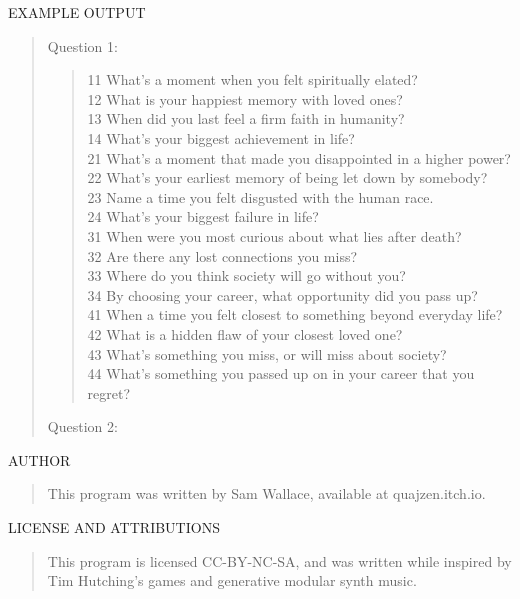 \documentclass{article}
\begin{document}
EXAMPLE OUTPUT
\begin{quote}
  Question 1:
  \begin{quote}
    11 \qquad What's a moment when you felt spiritually elated? \\
    12 \qquad What is your happiest memory with loved ones? \\
    13 \qquad When did you last feel a firm faith in humanity? \\
    14 \qquad What's your biggest achievement in life? \\
    21 \qquad What's a moment that made you disappointed in a higher power? \\
    22 \qquad What's your earliest memory of being let down by somebody? \\
    23 \qquad Name a time you felt disgusted with the human race. \\
    24 \qquad What's your biggest failure in life? \\
    31 \qquad When were you most curious about what lies after death? \\
    32 \qquad Are there any lost connections you miss? \\
    33 \qquad Where do you think society will go without you? \\
    34 \qquad By choosing your career, what opportunity did you pass up? \\
    41 \qquad When a time you felt closest to something beyond everyday life? \\
    42 \qquad What is a hidden flaw of your closest loved one? \\
    43 \qquad What's something you miss, or will miss about society? \\
    44 \qquad What's something you passed up on in your career that you regret?
  \end{quote}
  Question 2:
  \begin{quote}
    
  \end{quote}
\end{quote}


AUTHOR
\begin{quote}
  This program was written by Sam Wallace, available at quajzen.itch.io.
\end{quote}

LICENSE AND ATTRIBUTIONS
\begin{quote}
  This program is licensed CC-BY-NC-SA, and was written while inspired by Tim Hutching's games and generative modular synth music.
\end{quote}
\end{document}
